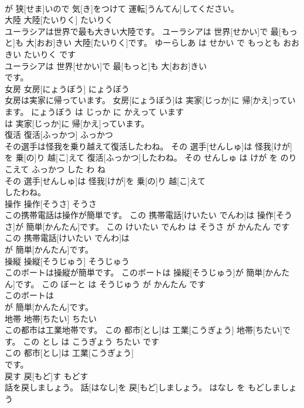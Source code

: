 \documentclass[8pt]{extreport}
\begin{document}
\begin{CJK}{UTF8}{min}
\\	が 狭[せま]いので 気[き]をつけて 運転[うんてん]してください。			
\\	大陸	大陸[たいりく]	たいりく	
\\	ユーラシアは世界で最も大きい大陸です。	ユーラシアは 世界[せかい]で 最[もっと]も 大[おお]きい 大陸[たいりく]です。	ゆーらしあ は せかい で もっとも おおきい たいりく です	
\\	ユーラシアは 世界[せかい]で 最[もっと]も 大[おお]きい
\\	です。			
\\	女房	女房[にょうぼう]	にょうぼう	
\\	女房は実家に帰っています。	女房[にょうぼう]は 実家[じっか]に 帰[かえ]っています。	にょうぼう は じっか に かえって います	
\\	は 実家[じっか]に 帰[かえ]っています。			
\\	復活	復活[ふっかつ]	ふっかつ	
\\	その選手は怪我を乗り越えて復活したわね。	その 選手[せんしゅ]は 怪我[けが]を 乗[の]り 越[こ]えて 復活[ふっかつ]したわね。	その せんしゅ は けが を のりこえて ふっかつ した わ ね	
\\	その 選手[せんしゅ]は 怪我[けが]を 乗[の]り 越[こ]えて
\\	したわね。			
\\	操作	操作[そうさ]	そうさ	
\\	この携帯電話は操作が簡単です。	この 携帯電話[けいたい でんわ]は 操作[そうさ]が 簡単[かんたん]です。	この けいたい でんわ は そうさ が かんたん です	
\\	この 携帯電話[けいたい でんわ]は
\\	が 簡単[かんたん]です。			
\\	操縦	操縦[そうじゅう]	そうじゅう	
\\	このボートは操縦が簡単です。	このボートは 操縦[そうじゅう]が 簡単[かんたん]です。	この ぼーと は そうじゅう が かんたん です	
\\	このボートは
\\	が 簡単[かんたん]です。			
\\	地帯	地帯[ちたい]	ちたい	
\\	この都市は工業地帯です。	この 都市[とし]は 工業[こうぎょう] 地帯[ちたい]です。	この とし は こうぎょう ちたい です	
\\	この 都市[とし]は 工業[こうぎょう]
\\	です。			
\\	戻す	戻[もど]す	もどす	
\\	話を戻しましょう。	話[はなし]を 戻[もど]しましょう。	はなし を もどしましょう	

\end{CJK}
\end{document}
